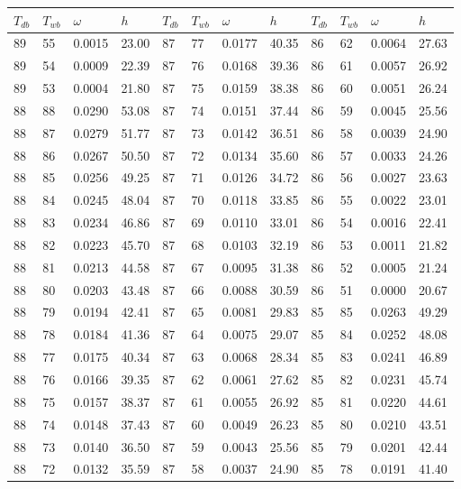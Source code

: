 \begin{tabular}{llll|llll|llll}
 \toprule 
\(T_{db}\) & \(T_{wb}\) & \(\omega\) & \(h\) & \(T_{db}\) & \(T_{wb}\) & \(\omega\) & \(h\) & \(T_{db}\) & \(T_{wb}\) & \(\omega\) & \(h\)  \\ \midrule 
89 & 55 & 0.0015 & 23.00 & 87 & 77 & 0.0177 & 40.35 & 86 & 62 & 0.0064 & 27.63\\
89 & 54 & 0.0009 & 22.39 & 87 & 76 & 0.0168 & 39.36 & 86 & 61 & 0.0057 & 26.92\\
89 & 53 & 0.0004 & 21.80 & 87 & 75 & 0.0159 & 38.38 & 86 & 60 & 0.0051 & 26.24\\
88 & 88 & 0.0290 & 53.08 & 87 & 74 & 0.0151 & 37.44 & 86 & 59 & 0.0045 & 25.56\\
88 & 87 & 0.0279 & 51.77 & 87 & 73 & 0.0142 & 36.51 & 86 & 58 & 0.0039 & 24.90\\
88 & 86 & 0.0267 & 50.50 & 87 & 72 & 0.0134 & 35.60 & 86 & 57 & 0.0033 & 24.26\\
88 & 85 & 0.0256 & 49.25 & 87 & 71 & 0.0126 & 34.72 & 86 & 56 & 0.0027 & 23.63\\
88 & 84 & 0.0245 & 48.04 & 87 & 70 & 0.0118 & 33.85 & 86 & 55 & 0.0022 & 23.01\\
88 & 83 & 0.0234 & 46.86 & 87 & 69 & 0.0110 & 33.01 & 86 & 54 & 0.0016 & 22.41\\
88 & 82 & 0.0223 & 45.70 & 87 & 68 & 0.0103 & 32.19 & 86 & 53 & 0.0011 & 21.82\\
88 & 81 & 0.0213 & 44.58 & 87 & 67 & 0.0095 & 31.38 & 86 & 52 & 0.0005 & 21.24\\
88 & 80 & 0.0203 & 43.48 & 87 & 66 & 0.0088 & 30.59 & 86 & 51 & 0.0000 & 20.67\\
88 & 79 & 0.0194 & 42.41 & 87 & 65 & 0.0081 & 29.83 & 85 & 85 & 0.0263 & 49.29\\
88 & 78 & 0.0184 & 41.36 & 87 & 64 & 0.0075 & 29.07 & 85 & 84 & 0.0252 & 48.08\\
88 & 77 & 0.0175 & 40.34 & 87 & 63 & 0.0068 & 28.34 & 85 & 83 & 0.0241 & 46.89\\
88 & 76 & 0.0166 & 39.35 & 87 & 62 & 0.0061 & 27.62 & 85 & 82 & 0.0231 & 45.74\\
88 & 75 & 0.0157 & 38.37 & 87 & 61 & 0.0055 & 26.92 & 85 & 81 & 0.0220 & 44.61\\
88 & 74 & 0.0148 & 37.43 & 87 & 60 & 0.0049 & 26.23 & 85 & 80 & 0.0210 & 43.51\\
88 & 73 & 0.0140 & 36.50 & 87 & 59 & 0.0043 & 25.56 & 85 & 79 & 0.0201 & 42.44\\
88 & 72 & 0.0132 & 35.59 & 87 & 58 & 0.0037 & 24.90 & 85 & 78 & 0.0191 & 41.40\\

\end{tabular}
